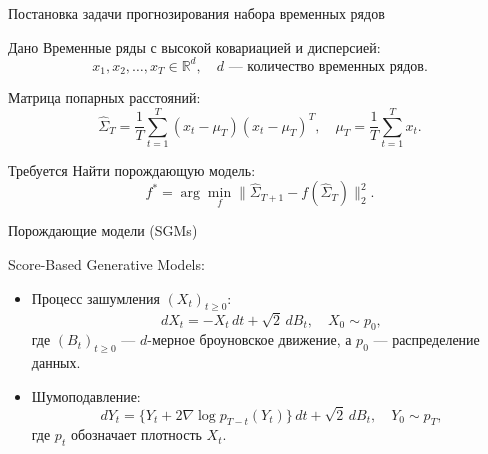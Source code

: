 \documentclass{beamer}
\begin{document}
\begin{frame}{Постановка задачи прогнозирования набора временных рядов}

\begin{block}{Дано}
Временные ряды с высокой ковариацией и дисперсией:  
\[
x_1, x_2, \ldots, x_T \in \mathbb{R}^d, \quad d \text{ — количество временных рядов.}
\]

Матрица попарных расстояний:  
\[
\hat{\Sigma}_T = \frac{1}{T} \sum_{t=1}^{T} (x_t - \mu_T)(x_t - \mu_T)^T, \quad \mu_T = \frac{1}{T} \sum_{t=1}^{T} x_t.
\]
\end{block}

\begin{block}{Требуется}
Найти порождающую модель:  
\[
f^* = \arg \min_f  \| \hat{\Sigma}_{T+1} - f(\hat{\Sigma}_T)\|^2_2.
\]
\end{block}

\end{frame}
\begin{frame}{Порождающие модели (SGMs)} 
 
\begin{block}{Score-Based Generative Models:} 
\begin{itemize} 
    \item Процесс зашумления \((X_t)_{t\ge0}\): \[
dX_t = -X_t \, dt + \sqrt{2} \, dB_t, \quad X_0 \sim p_0, \tag{1}
\] где $(B_t)_{t \geq 0}$ — $d$-мерное броуновское движение, а $p_0$ — распределение данных. 
    \item Шумоподавление: \[
dY_t = \{Y_t + 2 \nabla \log p_{T-t}(Y_t)\} \, dt + \sqrt{2} \, dB_t, \quad Y_0 \sim p_T, \tag{2}
\]
где $p_t$ обозначает плотность $X_t$.
\end{itemize} 
\end{block} 
 
 
\end{frame} 
\end{document}
